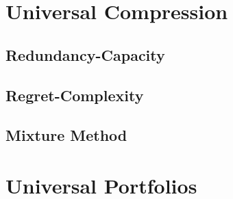 \section{Universal Compression}
\subsection{Redundancy-Capacity}
\subsection{Regret-Complexity}
\subsection{Mixture Method} 

\section{Universal Portfolios}